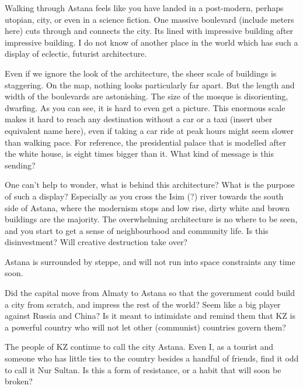 \documentclass{article}
\begin{document}
Walking through Astana feels like you have landed in a post-modern, perhaps utopian, city, or even in a science fiction. One massive boulevard (include meters here) cuts through and connects the city. Its lined with impressive building after impressive building. I do not know of another place in the world which has such a display of eclectic, futurist architecture.

Even if we ignore the look of the architecture, the sheer scale of buildings is staggering. On the map, nothing looks particularly far apart. But the length and width of the boulevards are astonishing. The size of the mosque is disorienting, dwarfing. As you can see, it is hard to even get a picture. 
This enormous scale makes it hard to reach any destination without a car or a taxi (insert uber equivalent name here), even if taking a car ride at peak hours might seem slower than walking pace. 
For reference, the presidential palace that is modelled after the white house, is eight times bigger than it. What kind of message is this sending? 

One can't help to wonder, what is behind this architecture? What is the purpose of such a display? Especially as you cross the Isim (?) river towards the south side of Astana, where the modernism stops and low rise, dirty white and brown buildings are the majority. The overwhelming architecture is no where to be seen, and you start to get a sense of neighbourhood and community life. Is this disinvestment? Will creative destruction take over?

Astana is surrounded by steppe, and will not run into space constraints any time soon. 

Did the capital move from Almaty to Astana so that the government could build a city from scratch, and impress the rest of the world? Seem like a big player against Russia and China? Is it meant to intimidate and remind them that KZ is a powerful country who will not let other (communist) countries govern them? 


The people of KZ continue to call the city Astana. Even I, as a tourist and someone who has little ties to the country besides a handful of friends, find it odd to call it Nur Sultan. Is this a form of resistance, or a habit that will soon be broken?

\pagebreak

\printbibliography
\end{document}
